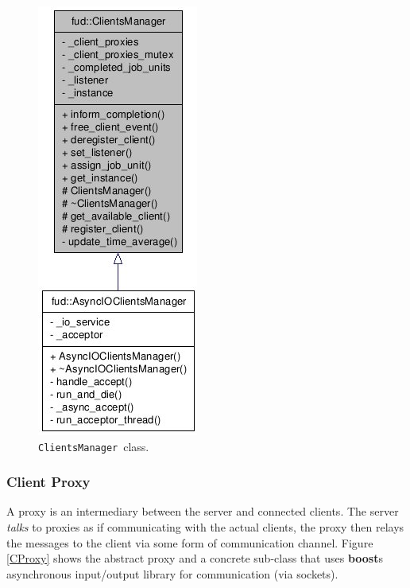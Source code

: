 \documentclass[a4paper,12pt,english]{report}
\newcommand{\CM}{\texttt{ClientsManager}}
\begin{document}
\begin{figure}[!ht]
\begin{center}
\includegraphics [bb= 0 0 100 270]{images/CM.jpg}
\end{center}
\caption{\CM \ class.}
\label{CM}
\end{figure}

\subsubsection{Client Proxy}

A proxy is an intermediary between the server and connected clients. The server \emph{talks} to proxies as if communicating with the actual clients, the proxy then relays the messages to the client via some form of communication channel. Figure \ref{CProxy} shows the abstract proxy and a concrete sub-class that uses \textbf{boost}s asynchronous input/output library for communication (via sockets).
\end{document}
